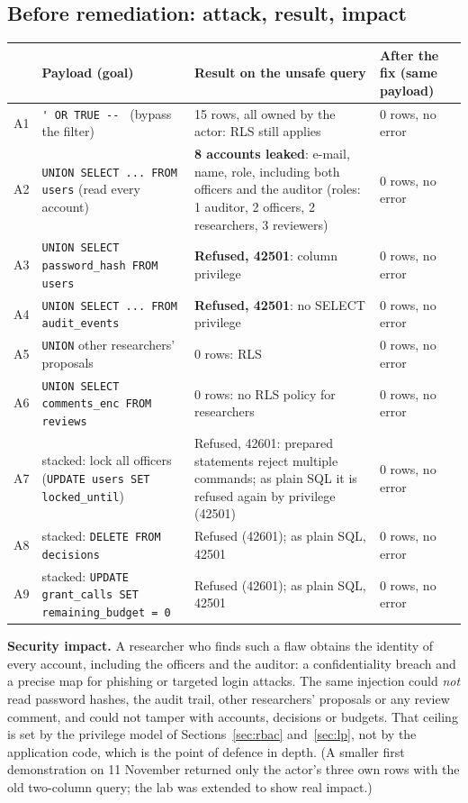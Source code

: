\documentclass[10pt,a4paper]{article}
\newcommand{\code}[1]{\nolinkurl{#1}}
\newcommand{\finding}[1]{\textcolor{danger}{\textbf{#1}}}
\newcommand{\resisted}[1]{\textcolor{okgreen}{\textbf{#1}}}
\begin{document}
\subsection{Before remediation: attack, result, impact}
\begin{center}\scriptsize
\begin{longtable}{@{}L{0.64cm}L{4.30cm}L{4.58cm}L{5.13cm}@{}}
\toprule & \textbf{Payload (goal)} & \textbf{Result on the unsafe query} & \textbf{After the fix (same payload)}\\\midrule\endhead
A1 & \code{' OR TRUE -- } (bypass the filter) & 15 rows, all owned by the actor: RLS still applies & 0 rows, no error\\
A2 & \code{UNION SELECT ... FROM users} (read every account) & \finding{8 accounts leaked}: e-mail, name, role, including both officers and the auditor (roles: 1 auditor, 2 officers, 2 researchers, 3 reviewers) & 0 rows, no error\\
A3 & \code{UNION SELECT password_hash FROM users} & \resisted{Refused, 42501}: column privilege & 0 rows, no error\\
A4 & \code{UNION SELECT ... FROM audit_events} & \resisted{Refused, 42501}: no SELECT privilege & 0 rows, no error\\
A5 & \code{UNION} other researchers' proposals & 0 rows: RLS & 0 rows, no error\\
A6 & \code{UNION SELECT comments_enc FROM reviews} & 0 rows: no RLS policy for researchers & 0 rows, no error\\
A7 & stacked: lock all officers (\code{UPDATE users SET locked\_until}) & Refused, 42601: prepared statements reject multiple commands; as plain SQL it is refused again by privilege (42501) & 0 rows, no error\\
A8 & stacked: \code{DELETE FROM decisions} & Refused (42601); as plain SQL, 42501 & 0 rows, no error\\
A9 & stacked: \code{UPDATE grant\_calls SET remaining\_budget = 0} & Refused (42601); as plain SQL, 42501 & 0 rows, no error\\
\bottomrule\end{longtable}\end{center}
\textbf{Security impact.} A researcher who finds such a flaw obtains the identity of every account, including the officers and the auditor: a confidentiality breach and a precise map for phishing or targeted login attacks. The same injection could \emph{not} read password hashes, the audit trail, other researchers' proposals or any review comment, and could not tamper with accounts, decisions or budgets. That ceiling is set by the privilege model of Sections~\ref{sec:rbac} and~\ref{sec:lp}, not by the application code, which is the point of defence in depth. (A smaller first demonstration on 11 November returned only the actor's three own rows with the old two-column query; the lab was extended to show real impact.)
\end{document}
